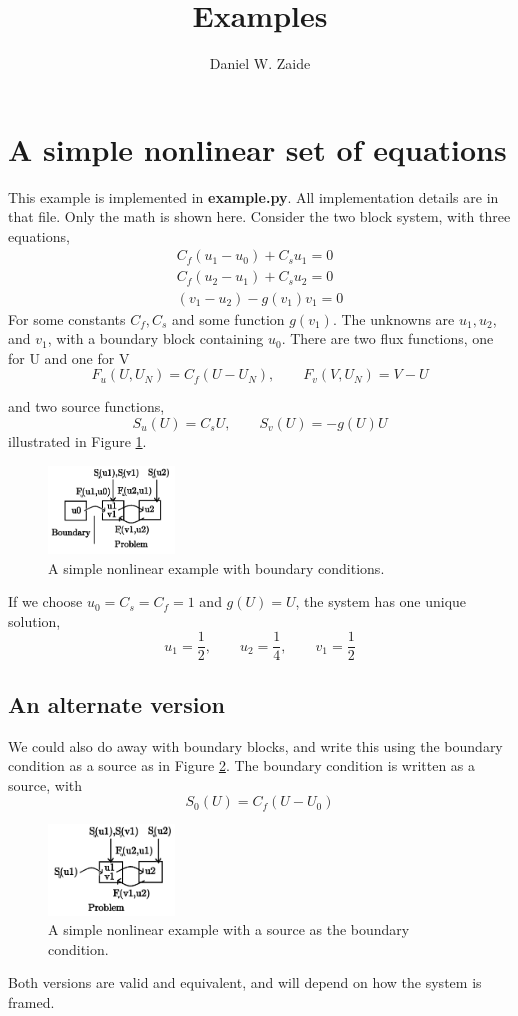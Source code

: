 \documentclass[11pt]{article}
\title{Examples}
\author{Daniel W. Zaide}
\begin{document}
\maketitle
\section{A simple nonlinear set of equations}
This example is implemented in {\bf example.py}. All implementation details are in that file. Only the math is shown here. Consider the two block system, with three equations,
\begin{eqnarray*}
C_f(u_1 - u_0) + C_su_1 = 0 \\ C_f(u_2 - u_1) + C_su_2 = 0 \\ (v_1-u_2) - g(v_1)v_1 = 0
\end{eqnarray*}
For some constants $C_f, C_s$ and some function $g(v_1)$. The unknowns are $u_1,u_2$, and $v_1$, with a boundary block containing $u_0$. There are two flux functions, one for U and one for V
\[
F_u(U,U_N) = C_f(U-U_N), \qquad F_v(V,U_N) = V-U
\]

and two source functions,
\[
S_u(U) = C_sU, \qquad S_v(U) = -g(U)U
\]
illustrated in Figure \ref{fig:ex1}.
\begin{figure}[!ht]
\centering
\includegraphics[width=0.3\textwidth]{images/example1.png}
\caption{A simple nonlinear example with boundary conditions.}
\label{fig:ex1}
\end{figure}


If we choose $u_0 = C_s = C_f = 1$ and $g(U) = U$, the system has one unique solution,
\[
u_1 = \frac{1}{2}, \qquad u_2 = \frac{1}{4}, \qquad v_1 = \frac{1}{2}
\]


\subsection{An alternate version}
We could also do away with boundary blocks, and write this using the boundary condition as a source as in Figure \ref{fig:ex2}. The boundary condition is written as a source, with
\[
S_0(U) = C_f(U-U_0)
\]
\begin{figure}[!ht]
\centering
\includegraphics[width=0.3\textwidth]{images/example1a.png}
\caption{A simple nonlinear example with a source as the boundary condition.}
\label{fig:ex2}
\end{figure}
Both versions are valid and equivalent, and will depend on how the system is framed.
\end{document}
